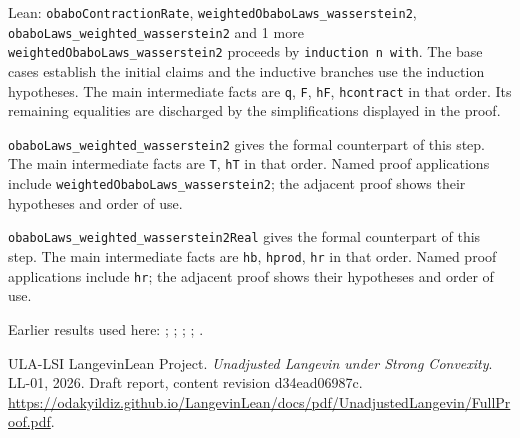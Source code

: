 \documentclass[11pt,a4paper]{article}
\begin{document}
\begin{leanbox}{Lean: \texttt{obaboContractionRate}, \texttt{weightedObaboLaws\_\allowbreak{}wasserstein2}, \texttt{obaboLaws\_\allowbreak{}weighted\_\allowbreak{}wasserstein2} and 1 more}
\texttt{weighted\allowbreak{}Obabo\allowbreak{}Laws\_\allowbreak{}wasserstein2} proceeds by \texttt{induction n with}. The base cases establish the initial claims and the inductive branches use the induction hypotheses. The main intermediate facts are \texttt{q}, \texttt{F}, \texttt{h\allowbreak{}F}, \texttt{hcontract} in that order. Its remaining equalities are discharged by the simplifications displayed in the proof.




\texttt{obabo\allowbreak{}Laws\_\allowbreak{}weighted\_\allowbreak{}wasserstein2} gives the formal counterpart of this step. The main intermediate facts are \texttt{T}, \texttt{h\allowbreak{}T} in that order. Named proof applications include \texttt{weighted\allowbreak{}Obabo\allowbreak{}Laws\_\allowbreak{}wasserstein2}; the adjacent proof shows their hypotheses and order of use.




\texttt{obabo\allowbreak{}Laws\_\allowbreak{}weighted\_\allowbreak{}wasserstein2\allowbreak{}Real} gives the formal counterpart of this step. The main intermediate facts are \texttt{hb}, \texttt{hprod}, \texttt{hr} in that order. Named proof applications include \texttt{hr}; the adjacent proof shows their hypotheses and order of use.
\end{leanbox}


Earlier results used here: \cite[Section~3.17.3]{LangevinLean2026ULASC}; \cite[Section~3.17.4]{LangevinLean2026ULASC}; \cite[Section~3.33.11]{LangevinLean2026ULASC}; \cite[Section~3.33.5]{LangevinLean2026ULASC}; \cite[Section~3.33.6]{LangevinLean2026ULASC}.

\begin{thebibliography}{ULA-LSI}
LangevinLean Project. \emph{Unadjusted Langevin under Strong Convexity}. LL-01, 2026. Draft report, content revision d34ead06987c. \url{https://odakyildiz.github.io/LangevinLean/docs/pdf/UnadjustedLangevin/FullProof.pdf}.
\end{thebibliography}
\end{document}
